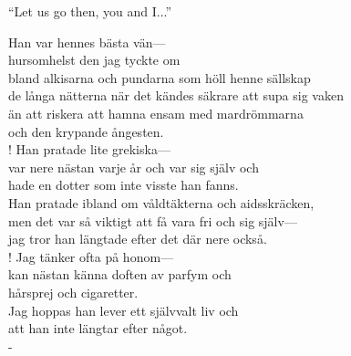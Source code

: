 \documentclass{poetrycollection}
\begin{document}
\startfrontmatter
    \maketitle
    
    \null\vfill
	\begin{rightquote}
        ``Let us go then, you and I...''
        
	\end{rightquote}
\startmainmatter

    
    
    \begin{poem}
        Han var hennes bästa vän---\\
        hursomhelst den jag tyckte om\\
        bland alkisarna och pundarna som höll henne sällskap \\
        de långa nätterna när det kändes säkrare att supa sig vaken\\
        än att riskera att hamna ensam med mardrömmarna \\
        och den krypande ångesten. 
    \\!
        Han pratade lite grekiska---\\
        var nere nästan varje år och var sig själv och\\
        hade en dotter som inte visste han fanns.\\
        Han pratade ibland om våldtäkterna och aidsskräcken,\\
        men det var så viktigt att få vara fri och sig själv---\\
        jag tror han längtade efter det där nere också. 
    \\!
        Jag tänker ofta på honom---\\
        kan nästan känna doften av parfym och \\
        \hin hårsprej och cigaretter.\\
        Jag hoppas han lever ett självvalt liv och \\
        att han inte längtar efter något. \\-
    \end{poem}
\end{document}
